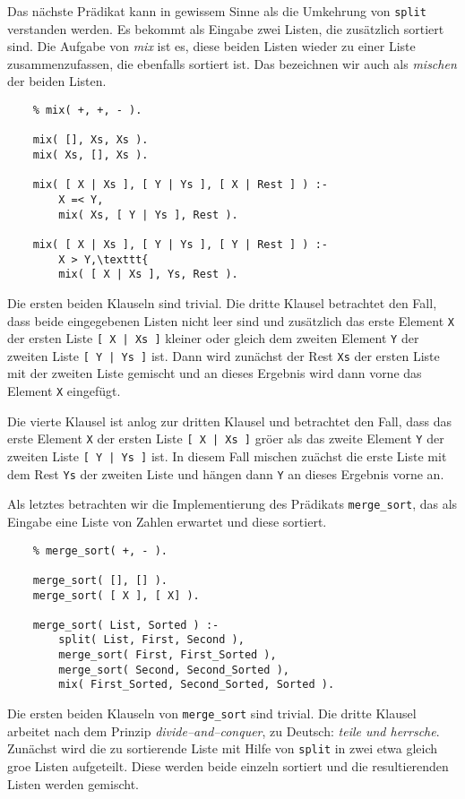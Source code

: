 Das n\"{a}chste Pr\"{a}dikat kann in gewissem Sinne als die Umkehrung von \texttt{split} verstanden werden.
Es bekommt als Eingabe zwei Listen, die zus\"{a}tzlich sortiert sind.  Die Aufgabe von \textsl{mix} ist es,
diese beiden Listen wieder zu einer Liste zusammenzufassen, die ebenfalls sortiert ist.  Das bezeichnen
wir auch als \emph{mischen} der beiden Listen.
\begin{verbatim}
    % mix( +, +, - ).

    mix( [], Xs, Xs ).
    mix( Xs, [], Xs ).

    mix( [ X | Xs ], [ Y | Ys ], [ X | Rest ] ) :-
        X =< Y,
        mix( Xs, [ Y | Ys ], Rest ).

    mix( [ X | Xs ], [ Y | Ys ], [ Y | Rest ] ) :-
        X > Y,\texttt{
        mix( [ X | Xs ], Ys, Rest ).
\end{verbatim}
Die ersten beiden Klauseln sind trivial.  Die dritte Klausel betrachtet den Fall, dass beide eingegebenen 
Listen
nicht leer sind und zus\"{a}tzlich das erste Element \texttt{X} der ersten Liste \texttt{[ X | Xs ]} kleiner 
oder gleich dem zweiten Element \texttt{Y} der zweiten Liste \texttt{[ Y | Ys ]} ist.  
Dann wird zun\"{a}chst der Rest \texttt{Xs} der ersten Liste mit der zweiten Liste gemischt und
an dieses Ergebnis wird dann vorne das Element \texttt{X} eingef\"{u}gt.   

Die vierte Klausel ist anlog zur dritten Klausel und betrachtet den Fall, dass
das erste Element \texttt{X} der ersten Liste \texttt{[ X | Xs ]} gr\"{o}\3er als das zweite  Element \texttt{Y} 
der zweiten Liste \texttt{[ Y | Ys ]} ist.
In diesem Fall mischen zu\"{a}chst die erste Liste mit dem  Rest \texttt{Ys} der zweiten Liste und 
h\"{a}ngen dann \texttt{Y} an dieses Ergebnis vorne an. 

Als letztes betrachten wir die Implementierung des Pr\"{a}dikats \texttt{merge\_sort}, das als Eingabe eine Liste von Zahlen
erwartet und diese sortiert.
\begin{verbatim}
    % merge_sort( +, - ).

    merge_sort( [], [] ).
    merge_sort( [ X ], [ X] ).

    merge_sort( List, Sorted ) :-
        split( List, First, Second ),
        merge_sort( First, First_Sorted ),
        merge_sort( Second, Second_Sorted ),
        mix( First_Sorted, Second_Sorted, Sorted ).
\end{verbatim}
Die ersten beiden Klauseln von \texttt{merge\_sort} sind trivial.
Die dritte Klausel arbeitet nach dem Prinzip \emph{divide--and--conquer}, zu Deutsch: \emph{teile und herrsche}.
Zun\"{a}chst wird die zu sortierende Liste mit Hilfe von \texttt{split} in zwei etwa gleich gro\3e Listen aufgeteilt.
Diese werden beide einzeln sortiert und die resultierenden Listen werden gemischt.  

